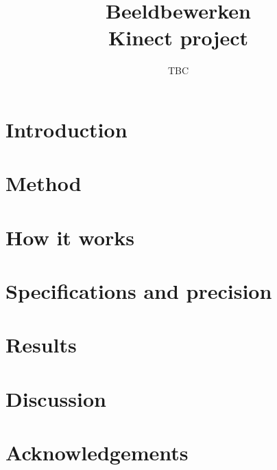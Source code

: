 \documentclass{article}
\title{
  Beeldbewerken \\ Kinect project
}
\author{
    TBC
}
\begin{document}
\maketitle

\renewcommand{\abstractname}{Executive Summary}

\newpage
\begin{abstract}

    

\end{abstract}

\clearpage

\tableofcontents

\clearpage

\section{Introduction} 
\label{sec:introduction}

    




\section{Method} 
\label{sec:method}

    



\section{How it works}
\label{sec:howitworks}

    


\section{Specifications and precision}
\label{sec:howitworks}

    


\section{Results} 
\label{sec:results}

    



\section{Discussion} 
\label{sec:discussion}

    




\section{Acknowledgements} 
\label{sec:discussion}

    




\appendix

\section{} 
\label{sec:appendixA}

    
\end{document}
